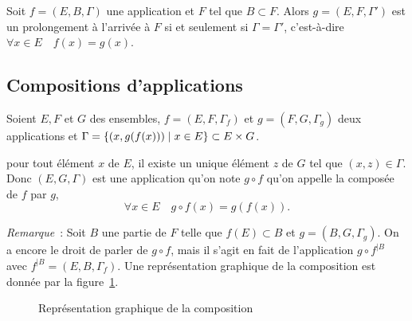 Soit \(f=(E,B,\Gamma)\) une application et \(F\) tel que \(B \subset F\). Alors 
\(g=(E,F,\Gamma')\) est un prolongement à l'arrivée à \(F\) si et seulement si 
\(\Gamma = \Gamma'\), c'est-à-dire \(\forall x \in E \quad f(x)=g(x)\).

\subsection{Compositions d'applications}
\label{chap3-subsec:compapp}

\begin{defdef}
    Soient \(E,F\) et \(G\) des ensembles, \(f=(E,F,\Gamma_f)\) et \(g=(F,G, 
    \Gamma_g)\) deux applications et \(\Gamma = \left\{(x,g(f(x)))\mathrel{}\middle|\mathrel{}x \in E\right\} \subset 
    E \times G\).
\end{defdef}

pour tout élément \(x\) de \(E\), il existe un unique élément \(z\) de \(G\) tel 
que \((x,z) \in \Gamma\). Donc \((E,G,\Gamma)\) est une application qu'on note 
\(g \circ f\) qu'on appelle la composée de \(f\) par \(g\),
\begin{equation}
    \forall x \in E \quad g \circ f(x)=g(f(x)).
\end{equation}

\emph{Remarque}~: Soit \(B\) une partie de \(F\) telle que \(f(E) \subset B\) et 
\(g=(B,G,\Gamma_g)\). On a encore le droit de parler de \(g \circ f\), mais il 
s'agit en fait de l'application \(g \circ f^{|B}\) avec \( f^{|B} 
=(E,B,\Gamma_f)\).
Une représentation graphique de la composition est donnée par la 
figure~\ref{chap3-fig:compose}.

\begin{figure}
    \centering
    \caption{Représentation graphique de la composition}
    \label{chap3-fig:compose}
\end{figure}

